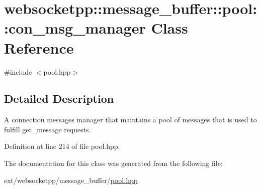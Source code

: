 \hypertarget{classwebsocketpp_1_1message__buffer_1_1pool_1_1con__msg__manager}{}\section{websocketpp\+:\+:message\+\_\+buffer\+:\+:pool\+:\+:con\+\_\+msg\+\_\+manager Class Reference}
\label{classwebsocketpp_1_1message__buffer_1_1pool_1_1con__msg__manager}


{\ttfamily \#include $<$pool.\+hpp$>$}



\subsection{Detailed Description}
A connection messages manager that maintains a pool of messages that is used to fulfill get\+\_\+message requests. 

Definition at line 214 of file pool.\+hpp.



The documentation for this class was generated from the following file\+:\begin{DoxyCompactItemize}
\item 
ext/websocketpp/message\+\_\+buffer/\hyperlink{pool_8hpp}{pool.\+hpp}\end{DoxyCompactItemize}
